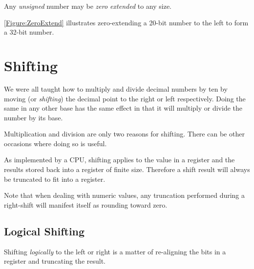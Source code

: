 \begin{tcolorbox}
Any {\em unsigned} number may be {\em zero extended} to any size.
\end{tcolorbox}

%
\autoref{Figure:ZeroExtend} illustrates zero-extending a 20-bit number to the
left to form a 32-bit number.

\begin{figure}[ht]
\centering
{}
\label{Figure:ZeroExtend}
\end{figure}


\section{Shifting}

We were all taught how to multiply and divide decimal numbers by ten
by moving (or {\em shifting}) the decimal point to the right or left 
respectively.  Doing the same in any other base has the same effect 
in that it will multiply or divide the number by its base.

%
Multiplication and division are only two reasons for shifting.  There
can be other occasions where doing so is useful.

As implemented by a CPU, shifting applies to the value in a register
and the results stored back into a register of finite size.  Therefore
a shift result will always be truncated to fit into a register.

%
Note that when dealing with numeric values, any truncation performed 
during a right-shift will manifest itself as rounding toward zero.

\subsection{Logical Shifting}

Shifting {\em logically} to the left or right is a matter of re-aligning
the bits in a register and truncating the result.

